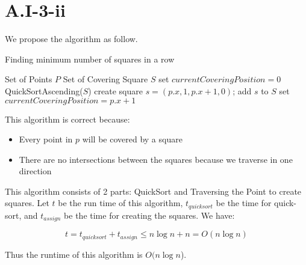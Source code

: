 \section{A.I-3-ii}
\label{a-1-3-2}
We propose the algorithm as follow.

\begin{algorithm}
  \caption{Finding minimum number of squares in a row}
  \begin{algorithmic}
    \Require Set of Points $P$
    \Ensure Set of Covering Square $S$
    \renewcommand{\algorithmicrequire}{\textbf{Input:}}
    \renewcommand{\algorithmicensure}{\textbf{Output:}}
    \algnewcommand{}
    \algnewcommand\Operation{\item[\algorithmicoperation]}
    \Operation
    \State set $currentCoveringPosition = 0$
    \State QuickSortAscending($S$)
    \State create square $s = (p.x, 1, p.x + 1, 0)$;
    \State add $s$ to $S$
    \State set $currentCoveringPosition = p.x + 1$
    \EndIf
    \EndFor
  \end{algorithmic}
\end{algorithm}

This algorithm is correct because:

\begin{itemize}
    \item Every point in $p$ will be covered by a square
    \item There are no intersections between the squares because we traverse in one direction
  \end{itemize}

  This algorithm consists of 2 parts: QuickSort and Traversing the Point to create squares. Let $t$ be the run time of this algorithm, $t_{quicksort}$ be the time for quick-sort, and $t_{assign}$ be the time for creating the squares. We have:

  \begin{equation}
    t = t_{quicksort} + t_{assign} \leq n\log n + n = O(n\log n)
  \end{equation}

  Thus the runtime of this algorithm is $O(n\log n$).
